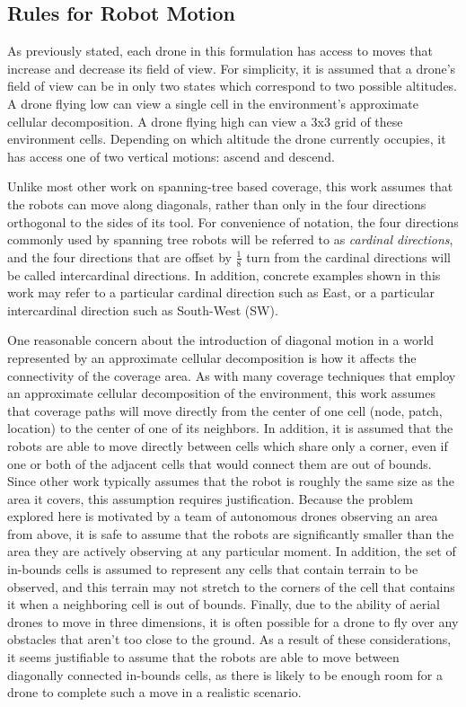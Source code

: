 
\subsection{Rules for Robot Motion}

As previously stated, each drone in this formulation has access to moves that increase and decrease its field of view. For simplicity, it is assumed that a drone's field of view can be in only two states which correspond to two possible altitudes. A drone flying low can view a single cell in the environment's approximate cellular decomposition. A drone flying high can view a 3x3 grid of these environment cells. Depending on which altitude the drone currently occupies, it has access one of two vertical motions: ascend and descend.

Unlike most other work on spanning-tree based coverage, this work assumes that the robots can move along diagonals, rather than only in the four directions orthogonal to the sides of its tool. For convenience of notation, the four directions commonly used by spanning tree robots will be referred to as \textit{cardinal directions}, and the four directions that are offset by $\frac{1}{8}$ turn from the cardinal directions will be called intercardinal directions. In addition, concrete examples shown in this work may refer to a particular cardinal direction such as East, or a particular intercardinal direction such as South-West (SW).

One reasonable concern about the introduction of diagonal motion in a world represented by an approximate cellular decomposition is how it affects the connectivity of the coverage area. As with many coverage techniques that employ an approximate cellular decomposition of the environment, this work assumes that coverage paths will move directly from the center of one cell (node, patch, location) to the center of one of its neighbors. In addition, it is assumed that the robots are able to move directly between cells which share only a corner, even if one or both of the adjacent cells that would connect them are out of bounds. Since other work typically assumes that the robot is roughly the same size as the area it covers, this assumption requires justification. Because the problem explored here is motivated by a team of autonomous drones observing an area from above, it is safe to assume that the robots are significantly smaller than the area they are actively observing at any particular moment. In addition, the set of in-bounds cells is assumed to represent any cells that contain terrain to be observed, and this terrain may not stretch to the corners of the cell that contains it when a neighboring cell is out of bounds. Finally, due to the ability of aerial drones to move in three dimensions, it is often possible for a drone to fly over any obstacles that aren't too close to the ground. As a result of these considerations, it seems justifiable to assume that the robots are able to move between diagonally connected in-bounds cells, as there is likely to be enough room for a drone to complete such a move in a realistic scenario.

